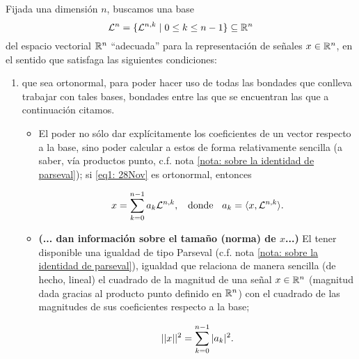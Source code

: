 \noindent 
\begin{listaObj}
\label{lista de objetivos}
Fijada una dimensión $n$, 
buscamos una base 
\begin{equation}
\label{eq1: 28Nov}
\mathcal{L}^{n}=\{ \mathcal{L}^{n,k} \hspace{0.1cm} |
\hspace{0.1cm} 0 \leq k \leq n-1  \} \subseteq \mathbb{R}^{n} 
\end{equation}
del espacio vectorial
$\mathbb{R}^{n}$ ``adecuada'' para la representación de señales
$x \in \mathbb{R}^{n}$,
en el sentido que satisfaga
las siguientes condiciones: 

\begin{enumerate}
\item 
que
sea ortonormal, para poder hacer uso de todas
las bondades que conlleva 
trabajar con tales bases, 
bondades entre las que se encuentran
las que a continuación citamos.
\begin{itemize}
\item 
\textbf{}
El poder no sólo dar explícitamente los coeficientes
de un vector respecto a la base, 
sino poder calcular a estos
de forma relativamente sencilla (a saber, vía productos punto,
c.f. nota \ref{nota: sobre la identidad de parseval}); si
\eqref{eq1: 28Nov} es ortonormal, entonces

\begin{equation}
\label{eq2: 13Feb}
x= \sum\limits_{k=0}^{n-1}a_{k}\mathcal{L}^{n,k},
\hspace{0.2cm} \text{ donde } \hspace{0.2cm}
a_{k}= \langle x , \mathcal{L}^{n,k} \rangle.
\end{equation}
\item
\textbf{\textcolor{ameMorado}{(... dan información sobre el tamaño (norma) de $x$...)}}
El tener disponible una igualdad de tipo Parseval
(c.f. nota \ref{nota: sobre la identidad de parseval}), igualdad que
relaciona de manera sencilla (de hecho, lineal)
el cuadrado de
la magnitud de una señal $x \in \mathbb{R}^{n}$ (magnitud dada
gracias al producto punto definido en $\mathbb{R}^{n}$)
con el cuadrado de las magnitudes de sus coeficientes
respecto a la base;

\[
||x||^{2}= \sum\limits_{k=0}^{n-1}|a_{k}|^{2}.
\]


\end{itemize}
\end{enumerate}
\end{listaObj}
